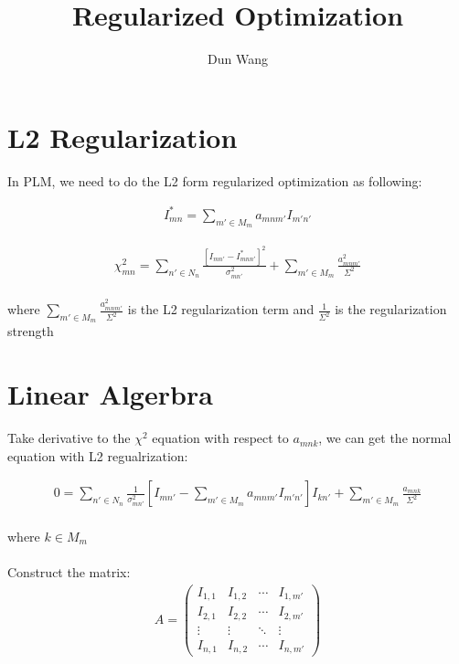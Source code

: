 \documentclass[]{article}
\begin{document}
\title{Regularized Optimization}
\author{Dun Wang}
\maketitle

\section{L2 Regularization}

In PLM, we need to do the L2 form regularized optimization as following:

\begin{align*}
  I_{mn}^{*}=\sum_{m' \in M_{m}} a_{mnm'}I_{m'n'}
\end{align*}

\begin{align*}
  \chi^2_{mn}    = \sum_{n'\in{N}_n} \frac{[I_{mn'} - I^{\ast}_{mnn'}]^2}{\sigma^2_{mn'}} 
		+ \sum_{m'\in{M}_m} \frac{a_{mnm'}^2}{\Sigma^2}
\end{align*}
\\
where $\sum_{m' \in {M}_m} \frac{a_{mnm'}^2}{\Sigma^2}$ is the L2 regularization term and $\frac{1}{\Sigma^2}$ is the regularization strength


\section{Linear Algerbra}
Take derivative to the $\chi^2$ equation with respect to $a_{mnk}$,  we can get the normal equation with L2 regualrization:
 
\begin{align*}
  0   = \sum_{n'\in{N}_n} \frac{1}{\sigma^2_{mn'}}[I_{mn'} -  \sum_{m'\in{M}_m}a_{mnm'}I_{m'n'}]I_{kn'}
                 + \sum_{m'\in{M}_m} \frac{a_{mnk}}{\Sigma^2}
\end{align*}
\\
where $k \in{M}_m$
\\
\\
Construct the matrix:
\\
\begin{align*}
A=
 \begin{pmatrix}
  I_{1,1} & I_{1,2} & \cdots & I_{1,m'} \\
  I_{2,1} & I_{2,2} & \cdots & I_{2,m'} \\
  \vdots  & \vdots  & \ddots & \vdots  \\
  I_{n,1} & I_{n,2} & \cdots & I_{n,m'}
 \end{pmatrix}
\end{align*}
\end{document}
